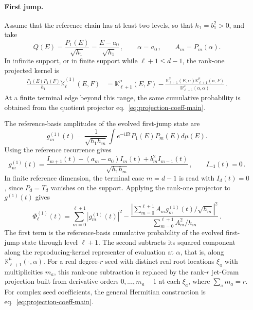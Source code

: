 \documentclass[a4paper,11pt]{article}
\def\dd{d}%
\def\ii{i}%
\def\ee{e}%
\theoremstyle{definition}
\theoremstyle{remark}
\newcommand{\dd}{\mathrm d}
\newcommand{\ii}{\mathrm i}
\newcommand{\ee}{\mathrm e}
\newcommand{\tK}{\widetilde{\mathbb K}}
\begin{document}
\paragraph{First jump.}
Assume that the reference chain has at least two levels, so that
$h_1=b_1^2>0$, and take
\begin{equation}
   Q(E)
   =
   \frac{P_1(E)}{\sqrt{h_1}}
   =
   \frac{E-a_0}{\sqrt{h_1}}\,,
   \qquad
   \alpha=a_0\,,
   \qquad
   A_m=P_m(\alpha).
\end{equation}
In infinite support, or in finite support while $\ell+1\le d-1$, the rank-one projected kernel is
\begin{equation}
\begin{aligned}
   \frac{P_1(E)P_1(F)}{h_1}
   \tK_\ell^{(1)}(E,F)
   &=
   \mathbb K_{\ell+1}^{\mu}(E,F)
   -
   \frac{
      \mathbb K_{\ell+1}^{\mu}(E,\alpha)
      \mathbb K_{\ell+1}^{\mu}(\alpha,F)}
   {\mathbb K_{\ell+1}^{\mu}(\alpha,\alpha)}\,.
\end{aligned}
   \label{eq:first-jump-kernel}
\end{equation}
At a finite terminal edge beyond this range, the same cumulative probability is obtained from the quotient projector
eq.~\eqref{eq:projection-coeff-main}. 

The reference-basis amplitudes of the evolved first-jump state are
\begin{equation}
   g_m^{(1)}(t)
   =
   \frac{1}{\sqrt{h_1h_m}}
   \int
   \ee^{-\ii Et}
   P_1(E)P_m(E)\dd\mu(E).
   \label{eq:g1-def-main}
\end{equation}
Using the reference recurrence gives
\begin{equation}
   g_m^{(1)}(t)
   =
   \frac{
      I_{m+1}(t)
      +(a_m-a_0)I_m(t)
      +b_m^2I_{m-1}(t)}
   {\sqrt{h_1h_m}}\,,
   \qquad
   I_{-1}(t)=0\,.
   \label{eq:g1-reference-moments-main}
\end{equation}
In finite reference dimension, the terminal case $m=d-1$ is read with
$I_d(t)=0$, since $P_d=T_d$ vanishes on the support. Applying the rank-one projector to $g^{(1)}(t)$ gives
\begin{equation}
   \Phi_\ell^{(1)}(t)
   =
   \sum_{m=0}^{\ell+1}
   |g_m^{(1)}(t)|^2
   -
   \frac{
      \left|
         \sum_{m=0}^{\ell+1}
         A_mg_m^{(1)}(t)/\sqrt{h_m}
      \right|^2}
   {\displaystyle
      \sum_{m=0}^{\ell+1}A_m^2/h_m}\,.
   \label{eq:first-jump-cumulative}
\end{equation}
The first term is the reference-basis cumulative probability of the evolved first-jump state through level $\ell+1$. The second subtracts its squared component along the reproducing-kernel representer of evaluation at $\alpha$, that is, along $\mathbb K^\mu_{\ell+1}(\cdot,\alpha)$. For a real degree-$r$ seed with distinct real root locations $\xi_a$ with multiplicities $m_a$, this rank-one subtraction is replaced by the rank-$r$ jet-Gram projection built from derivative orders $0,\ldots,m_a-1$ at each $\xi_a$, where $\sum_a m_a=r$. For complex seed coefficients, the general Hermitian construction is eq.~\eqref{eq:projection-coeff-main}.
\end{document}

